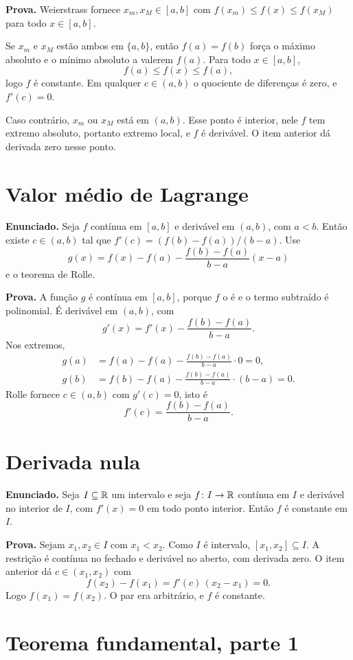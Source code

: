 \documentclass[11pt,a4paper]{article}
\begin{document}
\textbf{Prova.}
Weierstrass fornece $x_m,x_M\in[a,b]$ com $f(x_m)\le f(x)\le f(x_M)$ para todo $x\in[a,b]$.

Se $x_m$ e $x_M$ estão ambos em $\{a,b\}$, então $f(a)=f(b)$ força o máximo absoluto e o mínimo absoluto a valerem $f(a)$. Para todo $x\in[a,b]$,
\[
f(a)\le f(x)\le f(a),
\]
logo $f$ é constante. Em qualquer $c\in(a,b)$ o quociente de diferenças é zero, e $f'(c)=0$.

Caso contrário, $x_m$ ou $x_M$ está em $(a,b)$. Esse ponto é interior, nele $f$ tem extremo absoluto, portanto extremo local, e $f$ é derivável. O item anterior dá derivada zero nesse ponto.

\section{Valor médio de Lagrange}

\textbf{Enunciado.} Seja $f$ contínua em $[a,b]$ e derivável em $(a,b)$, com $a<b$. Então existe $c\in(a,b)$ tal que $f'(c)=(f(b)-f(a))/(b-a)$. Use
\[
g(x)=f(x)-f(a)-\frac{f(b)-f(a)}{b-a}(x-a)
\]
e o teorema de Rolle.

\textbf{Prova.}
A função $g$ é contínua em $[a,b]$, porque $f$ o é e o termo subtraído é polinomial. É derivável em $(a,b)$, com
\[
g'(x)=f'(x)-\frac{f(b)-f(a)}{b-a}.
\]
Nos extremos,
\begin{align*}
g(a)
&=f(a)-f(a)-\frac{f(b)-f(a)}{b-a}\cdot 0
=0,\\
g(b)
&=f(b)-f(a)-\frac{f(b)-f(a)}{b-a}\cdot(b-a)
=0.
\end{align*}
Rolle fornece $c\in(a,b)$ com $g'(c)=0$, isto é
\[
f'(c)=\frac{f(b)-f(a)}{b-a}.
\]

\section{Derivada nula}

\textbf{Enunciado.} Seja $I\subseteq\mathbb{R}$ um intervalo e seja $f\colon I\to\mathbb{R}$ contínua em $I$ e derivável no interior de $I$, com $f'(x)=0$ em todo ponto interior. Então $f$ é constante em $I$.

\textbf{Prova.}
Sejam $x_1,x_2\in I$ com $x_1<x_2$. Como $I$ é intervalo, $[x_1,x_2]\subseteq I$. A restrição é contínua no fechado e derivável no aberto, com derivada zero. O item anterior dá $c\in(x_1,x_2)$ com
\[
f(x_2)-f(x_1)=f'(c)\,(x_2-x_1)=0.
\]
Logo $f(x_1)=f(x_2)$. O par era arbitrário, e $f$ é constante.

\section{Teorema fundamental, parte 1}
\end{document}
